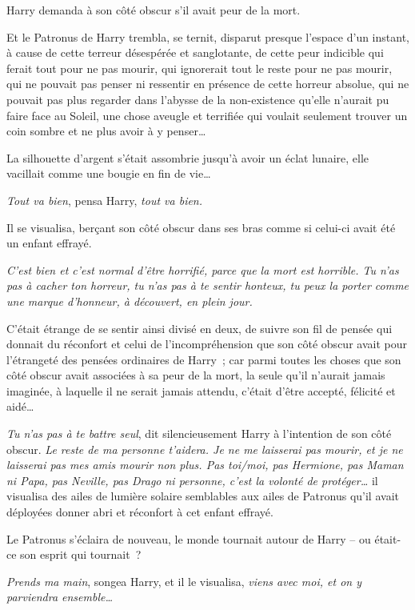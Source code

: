 Harry demanda à son côté obscur s'il avait peur de la mort.

Et le Patronus de Harry trembla, se ternit, disparut presque l'espace d'un instant, à cause de cette terreur désespérée et sanglotante, de cette peur indicible qui ferait tout pour ne pas mourir, qui ignorerait tout le reste pour ne pas mourir, qui ne pouvait pas penser ni ressentir en présence de cette horreur absolue, qui ne pouvait pas plus regarder dans l'abysse de la non-existence qu'elle n'aurait pu faire face au Soleil, une chose aveugle et terrifiée qui voulait seulement trouver un coin sombre et ne plus avoir à y penser…

La silhouette d'argent s'était assombrie jusqu'à avoir un éclat lunaire, elle vacillait comme une bougie en fin de vie…

\emph{Tout va bien}, pensa Harry, \emph{tout va bien.}

Il se visualisa, berçant son côté obscur dans ses bras comme si celui-ci avait été un enfant effrayé.

\emph{C'est bien et c'est normal d'être horrifié, parce que la mort est horrible. Tu n'as pas à cacher ton horreur, tu n'as pas à te sentir honteux, tu peux la porter comme une marque d'honneur, à découvert, en plein jour.}

C'était étrange de se sentir ainsi divisé en deux, de suivre son fil de pensée qui donnait du réconfort et celui de l'incompréhension que son côté obscur avait pour l'étrangeté des pensées ordinaires de Harry~; car parmi toutes les choses que son côté obscur avait associées à sa peur de la mort, la seule qu'il n'aurait jamais imaginée, à laquelle il ne serait jamais attendu, c'était d'être accepté, félicité et aidé…

\emph{Tu n'as pas à te battre seul}, dit silencieusement Harry à l'intention de son côté obscur. \emph{Le reste de ma personne t'aidera. Je ne me laisserai pas mourir, et je ne laisserai pas mes amis mourir non plus. Pas toi/moi, pas Hermione, pas Maman ni Papa, pas Neville, pas Drago ni personne, c'est la volonté de protéger…} il visualisa des ailes de lumière solaire semblables aux ailes de Patronus qu'il avait déployées donner abri et réconfort à cet enfant effrayé.

Le Patronus s'éclaira de nouveau, le monde tournait autour de Harry -- ou était-ce son esprit qui tournait~?

\emph{Prends ma main}, songea Harry, et il le visualisa, \emph{viens avec moi, et on y parviendra ensemble…}

